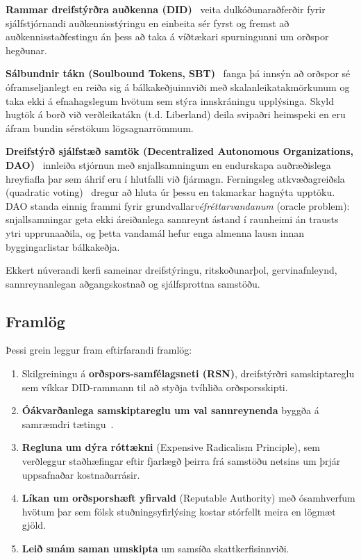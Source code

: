\documentclass[11pt,a4paper,twocolumn]{article}
\begin{document}
\textbf{Rammar dreifstýrðra auðkenna (DID)}~\cite{did2022} veita dulkóðunaraðferðir fyrir sjálfstjórnandi auðkennisstýringu en einbeita sér fyrst og fremst að auðkennisstaðfestingu án þess að taka á víðtækari spurningunni um orðspor hegðunar.

\textbf{Sálbundnir tákn (Soulbound Tokens, SBT)}~\cite{weyl2022} fanga þá innsýn að orðspor sé óframseljanlegt en reiða sig á bálkakeðjuinnviði með skalanleikatakmörkunum og taka ekki á efnahagslegum hvötum sem stýra innskráningu upplýsinga. Skyld hugtök á borð við verðleikatákn (t.d. Liberland) deila svipaðri heimspeki en eru áfram bundin sérstökum lögsagnarrömmum.

\textbf{Dreifstýrð sjálfstæð samtök (Decentralized Autonomous Organizations, DAO)}~\cite{buterin2014} innleiða stjórnun með snjallsamningum en endurskapa auðræðislega hreyfiafla þar sem áhrif eru í hlutfalli við fjármagn. Ferningsleg atkvæðagreiðsla (quadratic voting)~\cite{buterin2019} dregur að hluta úr þessu en takmarkar hagnýta upptöku. DAO standa einnig frammi fyrir grundvallar\emph{véfréttarvandanum} (oracle problem): snjallsamningar geta ekki áreiðanlega sannreynt ástand í raunheimi án trausts ytri upprunaaðila, og þetta vandamál hefur enga almenna lausn innan byggingarlistar bálkakeðja.

Ekkert núverandi kerfi sameinar dreifstýringu, ritskoðunarþol, gervinafnleynd, sannreynanlegan aðgangskostnað og sjálfsprottna samstöðu.

\subsection{Framlög}

Þessi grein leggur fram eftirfarandi framlög:
\begin{enumerate}[nosep]
\item Skilgreiningu á \textbf{orðspors-samfélagsneti (RSN)}, dreifstýrðri samskiptareglu sem víkkar DID-rammann til að styðja tvíhliða orðsporsskipti.
\item \textbf{Óákvarðanlega samskiptareglu um val sannreynenda} byggða á samræmdri tætingu~\cite{karger1997}.
\item \textbf{Regluna um dýra róttækni} (Expensive Radicalism Principle), sem verðleggur staðhæfingar eftir fjarlægð þeirra frá samstöðu netsins um þrjár uppsafnaðar kostnaðarrásir.
\item \textbf{Líkan um orðsporshæft yfirvald} (Reputable Authority) með ósamhverfum hvötum þar sem fölsk stuðningsyfirlýsing kostar stórfellt meira en lögmæt gjöld.
\item \textbf{Leið smám saman umskipta} um samsíða skattkerfisinnviði.
\end{enumerate}
\end{document}
